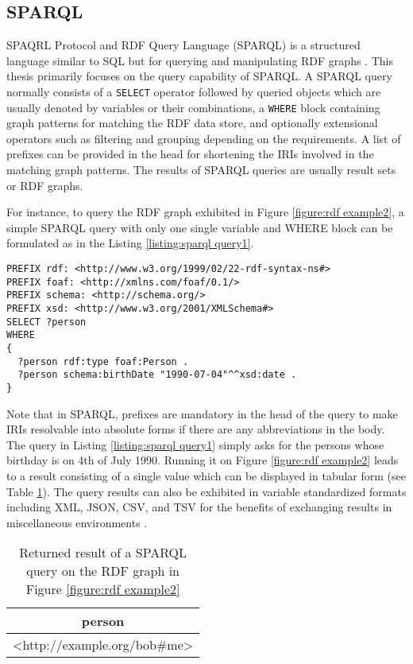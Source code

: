 \subsection{SPARQL} \label{subsection:sparql}
SPAQRL Protocol and RDF Query Language (SPARQL) is a structured language similar to SQL but for querying and manipulating RDF graphs \cite{Harris2013}. This thesis primarily focuses on the query capability of SPARQL. A SPARQL query normally consists of a \texttt{SELECT} operator followed by queried objects which are usually denoted by variables or their combinations, a \texttt{WHERE} block containing graph patterns for matching the RDF data store, and optionally extensional operators such as filtering and grouping depending on the requirements. A list of prefixes can be provided in the head for shortening the IRIs involved in the matching graph patterns. The results of SPARQL queries are usually result sets or RDF graphs. 

For instance, to query the RDF graph exhibited in Figure \ref{figure:rdf example2}, a simple SPARQL query with only one single variable and WHERE block can be formulated as in the Listing \ref{listing:sparql query1}.

\begin{lstlisting}[language=SPARQL, label={listing:sparql query1}, caption={A SPARQL query asking for "the persons whose birthday is on 1990 July 4th"}]
PREFIX rdf: <http://www.w3.org/1999/02/22-rdf-syntax-ns#>
PREFIX foaf: <http://xmlns.com/foaf/0.1/>
PREFIX schema: <http://schema.org/>
PREFIX xsd: <http://www.w3.org/2001/XMLSchema#>
SELECT ?person
WHERE
{ 
  ?person rdf:type foaf:Person .
  ?person schema:birthDate "1990-07-04"^^xsd:date . 
}
\end{lstlisting}

Note that in SPARQL, prefixes are mandatory in the head of the query to make IRIs resolvable into absolute forms if there are any abbreviations in the body. The query in Listing \ref{listing:sparql query1} simply asks for the persons whose birthday is on 4th of July 1990. Running it on Figure \ref{figure:rdf example2} leads to a result consisting of a single value which can be displayed in tabular form (see Table \ref{table:rdf simple result}). The query results can also be exhibited in variable standardized formats including XML, JSON, CSV, and TSV for the benefits of exchanging results in miscellaneous environments \cite{Harris2013}.

\begin{table}[h]
\centering
\begin{tabular}{|c|}
\hline
person \\
\hline
<http://example.org/bob\#me> \\
\hline
\end{tabular}
\caption{Returned result of a SPARQL query on the RDF graph in Figure \ref{figure:rdf example2}}
\label{table:rdf simple result}
\end{table}


